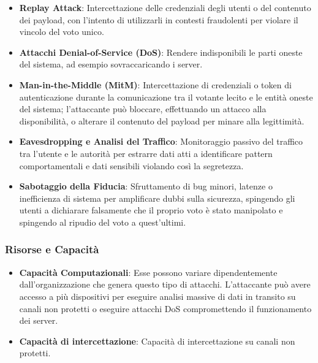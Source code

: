 \documentclass[a4paper,12pt]{article}
\begin{document}
\begin{itemize}
    \item \textbf{Replay Attack}: Intercettazione delle credenziali degli utenti o del contenuto dei payload, con l'intento di utilizzarli in contesti fraudolenti per violare il vincolo del voto unico.

    \item \textbf{Attacchi Denial-of-Service (DoS)}: Rendere indisponibili le parti oneste del sistema, ad esempio sovraccaricando i server.

    \item \textbf{Man-in-the-Middle (MitM)}: Intercettazione di credenziali o token di autenticazione durante la comunicazione tra il votante lecito e le entità oneste del sistema; l'attaccante può bloccare, effettuando un attacco alla disponibilità, o alterare il contenuto del payload per minare alla legittimità.

    \item \textbf{Eavesdropping e Analisi del Traffico}: Monitoraggio passivo del traffico tra l'utente e le autorità per estrarre dati atti a identificare pattern comportamentali e dati sensibili violando così la segretezza.

    \item \textbf{Sabotaggio della Fiducia}: Sfruttamento di bug minori, latenze o inefficienza di sistema per amplificare dubbi sulla sicurezza, spingendo gli utenti a dichiarare falsamente che il proprio voto è stato manipolato e spingendo al ripudio del voto a quest'ultimi.
\end{itemize}

\subsubsection*{Risorse e Capacità}

\begin{itemize}
    \item \textbf{Capacità Computazionali}: Esse possono variare dipendentemente dall'organizzazione che genera questo tipo di attacchi. L'attaccante può avere accesso a più dispositivi per eseguire analisi massive di dati in transito su canali non protetti o eseguire attacchi DoS compromettendo il funzionamento dei server.

    \item \textbf{Capacità di intercettazione}: Capacità di intercettazione su canali non protetti.
\end{itemize}
\end{document}
